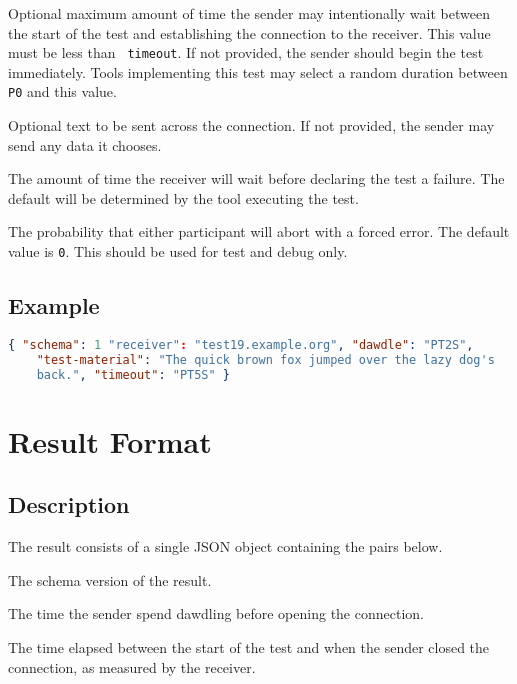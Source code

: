 \documentclass[10pt]{article}
\begin{document}
 Optional maximum amount of time the sender
may intentionally wait between the start of the test and establishing
the connection to the receiver.  This value must be less than {\tt
timeout}.  If not provided, the sender should begin the test
immediately.  Tools implementing this test may select a random
duration between {\tt P0} and this value.

 Optional text to be sent across the
connection.  If not provided, the sender may send any data it chooses.

 The amount of time the receiver will wait
before declaring the test a failure.  The default will be determined
by the tool executing the test.

 The probability that either participant
will abort with a forced error.  The default value is {\tt 0}.  This
should be used for test and debug only.


\subsection{Example}
\begin{lstlisting}[language=json]
{ "schema": 1 "receiver": "test19.example.org", "dawdle": "PT2S",
    "test-material": "The quick brown fox jumped over the lazy dog's
    back.", "timeout": "PT5S" }
\end{lstlisting}



%
%

\section{Result Format}

\subsection{Description}
The result consists of a single JSON object containing the pairs
below.  \seejson

 The schema version of the result.

 The time the sender spend dawdling
before opening the connection.

 The time elapsed between the start
of the test and when the sender closed the connection, as measured by
the receiver.
\end{document}
